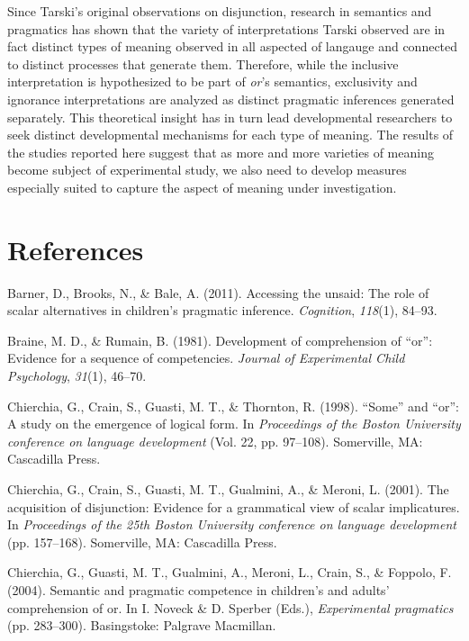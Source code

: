 \documentclass[floatsintext,man]{apa6}
\theoremstyle{definition}
\theoremstyle{definition}
\theoremstyle{definition}
\theoremstyle{remark}
\begin{document}
Since Tarski's original observations on disjunction, research in
semantics and pragmatics has shown that the variety of interpretations
Tarski observed are in fact distinct types of meaning observed in all
aspected of langauge and connected to distinct processes that generate
them. Therefore, while the inclusive interpretation is hypothesized to
be part of \emph{or}'s semantics, exclusivity and ignorance
interpretations are analyzed as distinct pragmatic inferences generated
separately. This theoretical insight has in turn lead developmental
researchers to seek distinct developmental mechanisms for each type of
meaning. The results of the studies reported here suggest that as more
and more varieties of meaning become subject of experimental study, we
also need to develop measures especially suited to capture the aspect of
meaning under investigation.

\newpage

\section{References}\label{references}

\setlength{\parindent}{-0.5in} \setlength{\leftskip}{0.5in}

\hypertarget{refs}{}
\hypertarget{ref-barner2011accessing}{}
Barner, D., Brooks, N., \& Bale, A. (2011). Accessing the unsaid: The
role of scalar alternatives in children's pragmatic inference.
\emph{Cognition}, \emph{118}(1), 84--93.

\hypertarget{ref-braine1981development}{}
Braine, M. D., \& Rumain, B. (1981). Development of comprehension of
``or'': Evidence for a sequence of competencies. \emph{Journal of
Experimental Child Psychology}, \emph{31}(1), 46--70.

\hypertarget{ref-chierchia1998some}{}
Chierchia, G., Crain, S., Guasti, M. T., \& Thornton, R. (1998).
``Some'' and ``or'': A study on the emergence of logical form. In
\emph{Proceedings of the Boston University conference on language
development} (Vol. 22, pp. 97--108). Somerville, MA: Cascadilla Press.

\hypertarget{ref-chierchia2001acquisition}{}
Chierchia, G., Crain, S., Guasti, M. T., Gualmini, A., \& Meroni, L.
(2001). The acquisition of disjunction: Evidence for a grammatical view
of scalar implicatures. In \emph{Proceedings of the 25th Boston
University conference on language development} (pp. 157--168).
Somerville, MA: Cascadilla Press.

\hypertarget{ref-chierchia2004semantic}{}
Chierchia, G., Guasti, M. T., Gualmini, A., Meroni, L., Crain, S., \&
Foppolo, F. (2004). Semantic and pragmatic competence in children's and
adults' comprehension of or. In I. Noveck \& D. Sperber (Eds.),
\emph{Experimental pragmatics} (pp. 283--300). Basingstoke: Palgrave
Macmillan.
\end{document}

